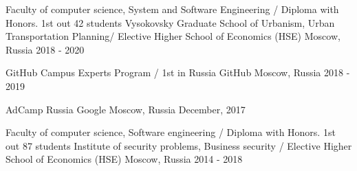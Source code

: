 

\cventryeducation
{Faculty of computer science, System and Software Engineering / Diploma with Honors. 1st out 42 students
		\newline Vysokovsky Graduate School of Urbanism, Urban Transportation Planning/ Elective} %
{Higher School of Economics (HSE)} %
{Moscow, Russia} %
{2018 - 2020} %

\cventryeducation
{GitHub Campus Experts Program / 1st in Russia} %
{GitHub} %
{Moscow, Russia} %
{2018 - 2019} %

\cventryeducation
{AdCamp Russia} %
{Google} %
{Moscow, Russia} %
{December, 2017} %

\cventryeducation
{Faculty of computer science, Software engineering / Diploma with Honors. 1st out 87 students
	\newline Institute of security problems, Business security / Elective} %
{Higher School of Economics (HSE)} %
{Moscow, Russia} %
{2014 - 2018} %




